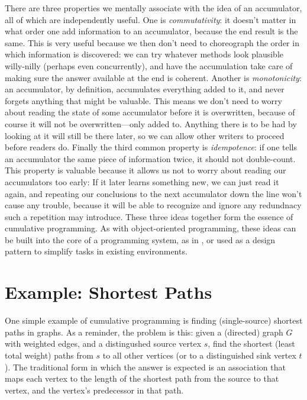 \documentclass[12pt]{article}
\begin{document}
There are three properties we mentally associate with the idea of an
accumulator, all of which are independently useful.  One is
\emph{commutativity}: it doesn't matter in what order one add information to
an accumulator, because the end result is the same.  This is very
useful because we then don't need to choreograph the order in which
information is discovered: we can try whatever methods look plausible
willy-nilly (perhaps even concurrently), and have the accumulation
take care of making sure the answer available at the end is coherent.
Another is \emph{monotonicity}: an accumulator, by definition, accumulates
everything added to it, and never forgets anything that might be
valuable.  This means we don't need to worry about reading the state
of some accumulator before it is overwritten, because of course it
will not be overwritten---only added to.  Anything there is to be had
by looking at it will still be there later, so we can allow other
writers to proceed before readers do.  Finally the third common
property is \emph{idempotence}: if one tells an accumulator the same piece of
information twice, it should not double-count.  This property is
valuable because it allows us not to worry about reading our
accumulators too early: If it later learns something new, we can just
read it again, and repeating our conclusions to the next accumulator
down the line won't cause any trouble, because it will be able to
recognize and ignore any redundnacy such a repetition may introduce.
These three ideas together form the essence of cumulative programming.
As with object-oriented programming, these ideas can be built into the
core of a programming system, as in \cite{art-thesis}, or used as a
design pattern to simplify tasks in existing environments.

\section{Example: Shortest Paths}

One simple example of cumulative programming is finding
(single-source) shortest paths in graphs.  As a reminder, the problem
is this: given a (directed) graph $G$ with weighted edges, and a
distingushed source vertex $s$, find the shortest (least total weight)
paths from $s$ to all other vertices (or to a distinguished sink
vertex $t$).  The traditional form in which the answer is expected is
an association that maps each vertex to the length of the shortest
path from the source to that vertex, and the vertex's predecessor in
that path.
\end{document}
